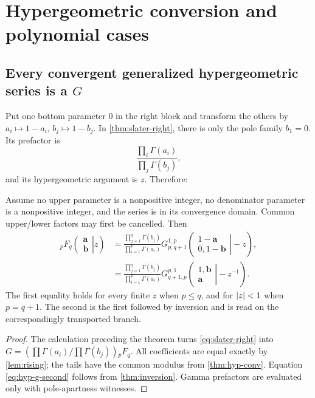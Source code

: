 \section{Hypergeometric conversion and polynomial cases}\label{sec:hypergeom-conversion}

\subsection{Every convergent generalized hypergeometric series is a \texorpdfstring{$G$}{G}}

Put one bottom parameter $0$ in the right block and transform the others by
$a_i\mapsto1-a_i$, $b_j\mapsto1-b_j$.  In
\cref{thm:slater-right}, there is only the pole family $b_1=0$.  Its prefactor
is
\[
 \frac{\prod_i\Gamma(a_i)}{\prod_j\Gamma(b_j)},
\]
and its hypergeometric argument is $z$.  Therefore:

\begin{theorem}\label{thm:hyp-to-g}
Assume no upper parameter is a nonpositive integer, no denominator parameter
is a nonpositive integer, and the series is in its convergence domain.  Common
upper/lower factors may first be cancelled.  Then
\begin{align}
{}_pF_q\!\left(\left.\begin{matrix}\mathbf a\\\mathbf b\end{matrix}\right|z\right)
&=\frac{\prod_{j=1}^{q}\Gamma(b_j)}
        {\prod_{i=1}^{p}\Gamma(a_i)}
G_{p,q+1}^{1,p}\!\left(
 \left.\begin{matrix}1-\mathbf a\\0,1-\mathbf b\end{matrix}\right|-z\right),
\label{eq:hyp-g-first}\\
&=\frac{\prod_{j=1}^{q}\Gamma(b_j)}
        {\prod_{i=1}^{p}\Gamma(a_i)}
G_{q+1,p}^{p,1}\!\left(
 \left.\begin{matrix}1,\mathbf b\\\mathbf a\end{matrix}\right|-z^{-1}\right).
\label{eq:hyp-g-second}
\end{align}
The first equality holds for every finite $z$ when $p\le q$, and for
$\left|z\right|<1$ when $p=q+1$.  The second is the first followed by inversion and is
read on the correspondingly transported branch.
\end{theorem}
\begin{proof}
The calculation preceding the theorem turns \eqref{eq:slater-right} into
$G=(\prod\Gamma(a_i)/\prod\Gamma(b_j)){}_pF_q$.  All coefficients are equal
exactly by \cref{lem:rising}; the tails have the common modulus from
\cref{thm:hyp-conv}.  Equation \eqref{eq:hyp-g-second} follows from
\cref{thm:inversion}.  Gamma prefactors are evaluated only with pole-apartness
witnesses.
\end{proof}

